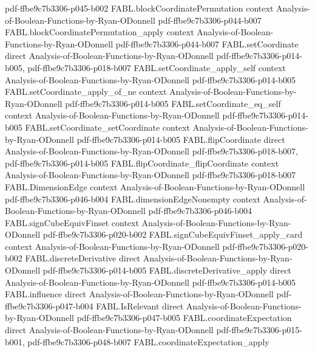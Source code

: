 \begin{theorem}
  {pdf-ffbe9c7b3306-p045-b002}
\proofstep
  {FABL.blockCoordinatePermutation}
  {context}
  {Analysis-of-Boolean-Functions-by-Ryan-ODonnell}
  {pdf-ffbe9c7b3306-p044-b007}
\proofstep
  {FABL.blockCoordinatePermutation_apply}
  {context}
  {Analysis-of-Boolean-Functions-by-Ryan-ODonnell}
  {pdf-ffbe9c7b3306-p044-b007}
\proofstep
  {FABL.setCoordinate}
  {direct}
  {Analysis-of-Boolean-Functions-by-Ryan-ODonnell}
  {pdf-ffbe9c7b3306-p014-b005,
    pdf-ffbe9c7b3306-p018-b007}
\proofstep
  {FABL.setCoordinate_apply_self}
  {context}
  {Analysis-of-Boolean-Functions-by-Ryan-ODonnell}
  {pdf-ffbe9c7b3306-p014-b005}
\proofstep
  {FABL.setCoordinate_apply_of_ne}
  {context}
  {Analysis-of-Boolean-Functions-by-Ryan-ODonnell}
  {pdf-ffbe9c7b3306-p014-b005}
\proofstep
  {FABL.setCoordinate_eq_self}
  {context}
  {Analysis-of-Boolean-Functions-by-Ryan-ODonnell}
  {pdf-ffbe9c7b3306-p014-b005}
\proofstep
  {FABL.setCoordinate_setCoordinate}
  {context}
  {Analysis-of-Boolean-Functions-by-Ryan-ODonnell}
  {pdf-ffbe9c7b3306-p014-b005}
\proofstep
  {FABL.flipCoordinate}
  {direct}
  {Analysis-of-Boolean-Functions-by-Ryan-ODonnell}
  {pdf-ffbe9c7b3306-p018-b007,
    pdf-ffbe9c7b3306-p014-b005}
\proofstep
  {FABL.flipCoordinate_flipCoordinate}
  {context}
  {Analysis-of-Boolean-Functions-by-Ryan-ODonnell}
  {pdf-ffbe9c7b3306-p018-b007}
\proofstep
  {FABL.DimensionEdge}
  {context}
  {Analysis-of-Boolean-Functions-by-Ryan-ODonnell}
  {pdf-ffbe9c7b3306-p046-b004}
\proofstep
  {FABL.dimensionEdgeNonempty}
  {context}
  {Analysis-of-Boolean-Functions-by-Ryan-ODonnell}
  {pdf-ffbe9c7b3306-p046-b004}
\proofstep
  {FABL.signCubeEquivFinset}
  {context}
  {Analysis-of-Boolean-Functions-by-Ryan-ODonnell}
  {pdf-ffbe9c7b3306-p020-b002}
\proofstep
  {FABL.signCubeEquivFinset_apply_card}
  {context}
  {Analysis-of-Boolean-Functions-by-Ryan-ODonnell}
  {pdf-ffbe9c7b3306-p020-b002}
\proofstep
  {FABL.discreteDerivative}
  {direct}
  {Analysis-of-Boolean-Functions-by-Ryan-ODonnell}
  {pdf-ffbe9c7b3306-p014-b005}
\proofstep
  {FABL.discreteDerivative_apply}
  {direct}
  {Analysis-of-Boolean-Functions-by-Ryan-ODonnell}
  {pdf-ffbe9c7b3306-p014-b005}
\proofstep
  {FABL.influence}
  {direct}
  {Analysis-of-Boolean-Functions-by-Ryan-ODonnell}
  {pdf-ffbe9c7b3306-p047-b004}
\proofstep
  {FABL.IsRelevant}
  {direct}
  {Analysis-of-Boolean-Functions-by-Ryan-ODonnell}
  {pdf-ffbe9c7b3306-p047-b005}
\proofstep
  {FABL.coordinateExpectation}
  {direct}
  {Analysis-of-Boolean-Functions-by-Ryan-ODonnell}
  {pdf-ffbe9c7b3306-p015-b001,
    pdf-ffbe9c7b3306-p048-b007}
\proofstep
  {FABL.coordinateExpectation_apply}

\end{theorem}
